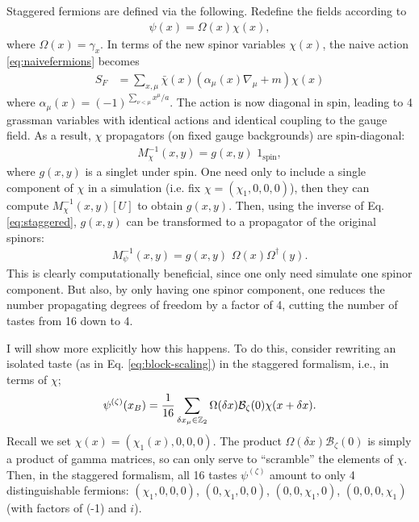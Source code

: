     Staggered fermions are defined via the following. Redefine the fields according to
    \begin{align}
      \psi(x) = \Omega(x) \chi(x),
      \label{eq:staggered}
    \end{align}
    where $\Omega(x)=\gamma_x$. In terms of the new spinor variables $\chi(x)$, the naive action \eqref{eq:naivefermions} becomes
    \begin{align}
      S_F &= \sum_{x,\mu} \bar{\chi}(x)(\alpha_{\mu}(x) \nabla_{\mu} + m ) \chi(x)
    \end{align}
    where $\alpha_{\mu}(x) = (-1)^{\sum_{\nu < \mu} x^{\mu}/a}$. The action is now diagonal in spin, leading to 4 grassman variables with identical actions and identical coupling to the gauge field. As a result, $\chi$ propagators (on fixed gauge backgrounds) are spin-diagonal:
    \begin{align}
      M^{-1}_{\chi}(x,y) = g(x,y) \,\, 1_{\text{spin}},
    \end{align}
    where $g(x,y)$ is a singlet under spin. One need only to include a single component of $\chi$ in a simulation (i.e. fix $\chi = (\chi_1,0,0,0)$), then they can compute $M^{-1}_{\chi}(x,y)[U]$ to obtain $g(x,y)$. Then, using the inverse of Eq. \eqref{eq:staggered}, $g(x,y)$ can be transformed to a propagator of the original spinors:
    \begin{align}
      M_{\psi}^{-1}(x,y) = g(x,y) \,\,\Omega(x)\Omega^{\dagger}(y).
    \end{align}
    This is clearly computationally beneficial, since one only need simulate one spinor component. But also, by only having one spinor component, one reduces the number propagating degrees of freedom by a factor of 4, cutting the number of tastes from 16 down to 4.

    I will show more explicitly how this happens. To do this, consider rewriting an isolated taste (as in Eq. \eqref{eq:block-scaling}) in the staggered formalism, i.e., in terms of $\chi$;
    \begin{align}
      \psi^{(\zeta)}(x_B) = {1\over 16} \sum_{\delta x_{\mu} \in \mathbb{Z}_2} \Omega(\delta x) \mathcal{B}_{\zeta}(0) \chi(x+\delta x).
    \label{eq:chi_blockscale}
    \end{align}
    Recall we set $\chi(x) = (\chi_1(x),0,0,0)$. The product $\Omega(\delta x)\mathcal{B}_{\zeta}(0)$ is simply a product of gamma matrices, so can only serve to ``scramble'' the elements of $\chi$. Then, in the staggered formalism, all 16 tastes $\psi^{(\zeta)}$ amount to only 4 distinguishable fermions: $(\chi_1,0,0,0)$, $(0,\chi_1,0,0)$, $(0,0,\chi_1,0)$, $(0,0,0,\chi_1)$ (with factors of (-1) and $i$).

